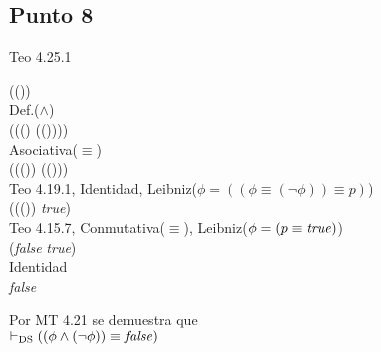 \documentclass{article}
\begin{document}
\subsection{Punto 8}
\begin{logicenv}{Teo 4.25.1}
    \begin{derivation}
            (\phi \land (\neg \phi))\\
        Def.($\land$)\\
            (\phi \equiv ((\neg \phi) \equiv (\phi \lor (\neg \phi))))\\
        Asociativa($\equiv$)\\
            ((\phi \equiv (\neg \phi)) \equiv (\phi \lor (\neg \phi)))\\
        Teo 4.19.1, Identidad, Leibniz($\phi = ((\phi \equiv (\neg \phi)) \equiv p)$)\\
            ((\phi \equiv (\neg \phi)) \equiv \textrm{\textit{true}})\\
        Teo 4.15.7, Conmutativa($\equiv$), Leibniz($\phi = (p \equiv \textrm{\textit{true}})$)\\
            (\textrm{\textit{false}} \equiv \textrm{\textit{true}})\\
        Identidad\\
            \textrm{\textit{false}}
    \end{derivation}
    Por MT 4.21 se demuestra que\\
    $\vdash_{\text{DS}} ((\phi \land (\neg \phi)) \equiv \textrm{\textit{false}})$
\end{logicenv}
\end{document}
